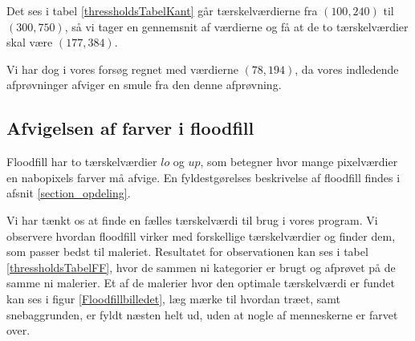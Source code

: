 Det ses i tabel \ref{thressholdsTabelKant} går tærskelværdierne
fra $(100,240)$ til $(300,750)$, så vi tager en gennemsnit af værdierne
og få at de to tærskelværdier skal være $(177,384)$. 

Vi har dog i vores forsøg regnet med værdierne $(78,194)$, da vores
indledende afprøvninger afviger en smule fra den denne afprøvning.

\subsection{Afvigelsen af farver i floodfill}
Floodfill har to tærskelværdier $lo$ og $up$, som betegner hvor mange
pixelværdier en nabopixels farver må afvige. En
fyldestgørelses beskrivelse af floodfill findes i afsnit
\ref{section_opdeling}. 

Vi har tænkt os at finde en fælles tærskelværdi til brug i vores
program. Vi observere hvordan floodfill virker med forskellige
tærskelværdier og finder dem, som passer bedst til maleriet. Resultatet
for observationen kan ses i tabel \ref{thressholdsTabelFF}, hvor de
sammen ni kategorier er brugt og afprøvet på de samme ni malerier. Et af
de malerier hvor den optimale tærskelværdi er fundet kan ses i figur
\ref{Floodfillbilledet}, læg mærke til hvordan træet, samt
snebaggrunden, er fyldt næsten helt ud, uden at nogle af menneskerne er farvet over.


